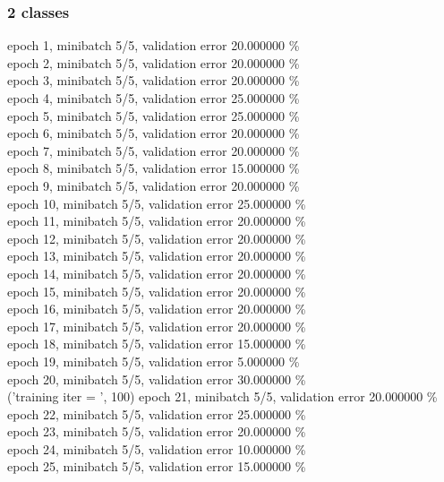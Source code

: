 \documentclass[a4paper]{article}
\begin{document}
\subsubsection{2 classes}
epoch 1, minibatch 5/5, validation error 20.000000 \% \\
epoch 2, minibatch 5/5, validation error 20.000000 \% \\
epoch 3, minibatch 5/5, validation error 20.000000 \% \\
epoch 4, minibatch 5/5, validation error 25.000000 \% \\
epoch 5, minibatch 5/5, validation error 25.000000 \% \\
epoch 6, minibatch 5/5, validation error 20.000000 \% \\
epoch 7, minibatch 5/5, validation error 20.000000 \% \\
epoch 8, minibatch 5/5, validation error 15.000000 \% \\
epoch 9, minibatch 5/5, validation error 20.000000 \% \\
epoch 10, minibatch 5/5, validation error 25.000000 \% \\
epoch 11, minibatch 5/5, validation error 20.000000 \% \\
epoch 12, minibatch 5/5, validation error 20.000000 \% \\
epoch 13, minibatch 5/5, validation error 20.000000 \% \\
epoch 14, minibatch 5/5, validation error 20.000000 \% \\
epoch 15, minibatch 5/5, validation error 20.000000 \% \\
epoch 16, minibatch 5/5, validation error 20.000000 \% \\
epoch 17, minibatch 5/5, validation error 20.000000 \% \\
epoch 18, minibatch 5/5, validation error 15.000000 \% \\
epoch 19, minibatch 5/5, validation error 5.000000 \% \\
epoch 20, minibatch 5/5, validation error 30.000000 \% \\
('training \@ iter = ', 100)
epoch 21, minibatch 5/5, validation error 20.000000 \% \\
epoch 22, minibatch 5/5, validation error 25.000000 \% \\
epoch 23, minibatch 5/5, validation error 20.000000 \% \\
epoch 24, minibatch 5/5, validation error 10.000000 \% \\
epoch 25, minibatch 5/5, validation error 15.000000 \% \\
\end{document}
